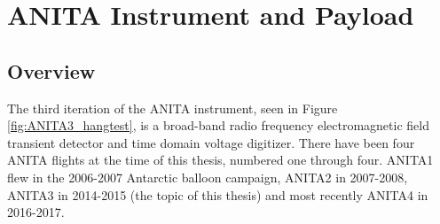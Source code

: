 
\chapter{ANITA Instrument and Payload}
\section{Overview}
	The third iteration of the ANITA instrument, seen in Figure \ref{fig:ANITA3_hangtest}, is a broad-band radio frequency electromagnetic field transient detector and time domain voltage digitizer.  There have been four ANITA flights at the time of this thesis, numbered one through four.  ANITA1 flew in the 2006-2007 Antarctic balloon campaign\cite{ANITA1}, ANITA2 in 2007-2008\cite{ANITA2}, ANITA3 in 2014-2015 (the topic of this thesis) and most recently ANITA4 in 2016-2017.
	
